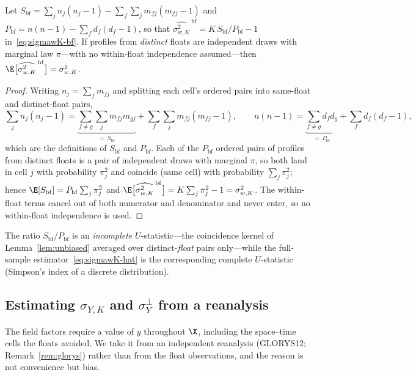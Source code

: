 \begin{lemma}
\label{lem:bf-unbiased}
Let $S_{\mathrm{bf}}=\sum_j n_j(n_j-1)-\sum_f\sum_j m_{fj}(m_{fj}-1)$ and
$P_{\mathrm{bf}}=n(n-1)-\sum_f d_f(d_f-1)$, so that
$\widehat{\sigma_{w,K}^2}^{\,\mathrm{bf}}=K\,S_{\mathrm{bf}}/P_{\mathrm{bf}}-1$
in~\eqref{eq:sigmawK-bf}. If profiles from \emph{distinct} floats are
independent draws with marginal law $\pi$---with no within-float
independence assumed---then
$\E\big[\widehat{\sigma_{w,K}^2}^{\,\mathrm{bf}}\big]=\sigma_{w,K}^2$.
\end{lemma}
\begin{proof}
Writing $n_j=\sum_f m_{fj}$ and splitting each cell's ordered pairs into
same-float and distinct-float pairs,
\[
  \sum_j n_j(n_j-1)
  =\underbrace{\sum_{f\ne g}\sum_j m_{fj}m_{gj}}_{=\,S_{\mathrm{bf}}}
   +\sum_f\sum_j m_{fj}(m_{fj}-1),
  \qquad
  n(n-1)=\underbrace{\sum_{f\ne g}d_f d_g}_{=\,P_{\mathrm{bf}}}+\sum_f d_f(d_f-1),
\]
which are the definitions of $S_{\mathrm{bf}}$ and $P_{\mathrm{bf}}$.
Each of the $P_{\mathrm{bf}}$ ordered pairs of profiles from distinct
floats is a pair of independent draws with marginal $\pi$, so both land
in cell $j$ with probability $\pi_j^2$ and coincide (same cell) with
probability $\sum_j\pi_j^2$; hence
$\E[S_{\mathrm{bf}}]=P_{\mathrm{bf}}\sum_j\pi_j^2$ and
$\E\big[\widehat{\sigma_{w,K}^2}^{\,\mathrm{bf}}\big]=K\sum_j\pi_j^2-1
=\sigma_{w,K}^2$. The within-float terms cancel out of both numerator
and denominator and never enter, so no within-float independence is
used.
\end{proof}

The ratio $S_{\mathrm{bf}}/P_{\mathrm{bf}}$ is an \emph{incomplete}
$U$-statistic---the coincidence kernel of Lemma~\ref{lem:unbiased}
averaged over distinct-\emph{float} pairs only---while the full-sample
estimator~\eqref{eq:sigmawK-hat} is the corresponding complete
$U$-statistic (Simpson's index of a discrete distribution).

\subsection{Estimating $\sigma_{Y,K}$ and $\sigma_Y^{\perp}$ from a
reanalysis}
\label{sec:sigmaY}

The field factors require a value of $y$ throughout $\X$, including the
space--time cells the floats avoided. We take it from an independent
reanalysis (GLORYS12; Remark~\ref{rem:glorys}) rather than from the
float observations, and the reason is not convenience but bias.

